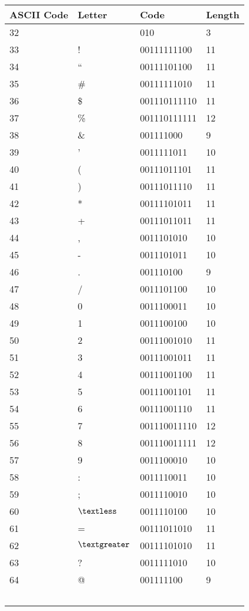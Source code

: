 \documentclass[]{article}
\begin{document}
\begin{center}
\begin{tabular}{ | l | l | l | l |} \hline
	﻿\textbf{ASCII Code} & ﻿\textbf{Letter} & ﻿\textbf{Code} & ﻿\textbf{Length} \\ \hline
        32 &   & 010 & 3 \\ \hline
		33 & ! & 00111111100 & 11 \\ \hline
		34 & \textquotedblleft & 00111101100 & 11 \\ \hline
		35 & \# & 00111111010 & 11 \\ \hline
		36 & \$ & 001110111110 & 11 \\ \hline
		37 & \% & 001110111111 & 12 \\ \hline
		38 & \& & 001111000    & 9 \\ \hline
		39 & '  & 0011111011   & 10 \\ \hline
		40 & (  & 00111011101  & 11 \\ \hline
		41 & )  & 00111011110  & 11 \\ \hline
		42 & *  & 00111101011  & 11 \\ \hline
		43 & +  & 00111011011  & 11 \\ \hline
		44 & ,  & 0011101010   & 10 \\ \hline
		45 & -  & 0011101011   & 10 \\ \hline
		46 & .  & 001110100    & 9 \\ \hline
		47 & /  & 0011101100   & 10 \\ \hline
		48 & 0  & 0011100011   & 10 \\ \hline
		49 & 1  & 0011100100   & 10 \\ \hline
		50 & 2  & 00111001010  & 11 \\ \hline
		51 & 3  & 00111001011  & 11 \\ \hline
		52 & 4  & 00111001100  & 11 \\ \hline
		53 & 5  & 00111001101  & 11 \\ \hline
		54 & 6  & 00111001110  & 11 \\ \hline
		55 & 7  & 001110011110 & 12 \\ \hline
		56 & 8  & 001110011111 & 12 \\ \hline
		57 & 9  & 0011100010   & 10 \\ \hline
		58 & :  & 0011110011   & 10 \\ \hline
		59 & ;  & 0011110010   & 10 \\ \hline
		60 & $\textless$ & 0011110100 & 10 \\ \hline
		61 & = & 00111011010 & 11 \\ \hline
		62 & $\textgreater$ & 00111101010 & 11 \\ \hline
		63 & ? & 0011111010 & 10 \\ \hline
		64 & @ & 001111100 & 9 \\ \hline
	﻿\end{tabular}
\end{center}
\end{document}
